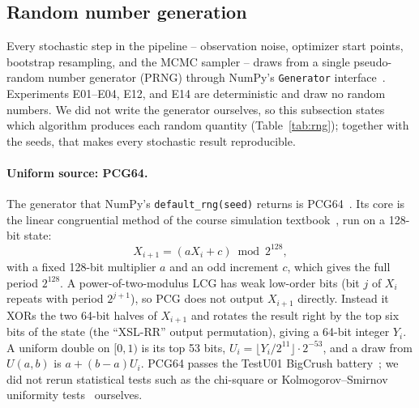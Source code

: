\subsection{Random number generation}
\label{sec:rng}
Every stochastic step in the pipeline -- observation noise, optimizer start points, bootstrap
resampling, and the MCMC sampler -- draws from a single pseudo-random number generator (PRNG)
through NumPy's \texttt{Generator} interface~\cite{harris2020numpy}. Experiments E01--E04, E12,
and E14 are deterministic and draw no random numbers. We did not write the generator ourselves, so
this subsection states which algorithm produces each random quantity
(Table~\ref{tab:rng}); together with the seeds, that makes every stochastic result reproducible.

\paragraph{Uniform source: PCG64.} The generator that NumPy's \texttt{default\_rng(seed)}
returns is PCG64~\cite{oneill2014pcg}. Its core is the linear congruential method of the course
simulation textbook~\cite{banks2010}, run on a 128-bit state:
\begin{equation}
  X_{i+1} = (a X_i + c) \bmod 2^{128}, \label{eq:lcg}
\end{equation}
with a fixed 128-bit multiplier $a$ and an odd increment $c$, which gives the full period
$2^{128}$. A power-of-two-modulus LCG has weak low-order bits (bit $j$ of $X_i$ repeats with period
$2^{j+1}$), so PCG does not output $X_{i+1}$ directly. Instead it XORs the two 64-bit halves of
$X_{i+1}$ and rotates the result right by the top six bits of the state (the ``XSL-RR'' output
permutation), giving a 64-bit integer $Y_i$. A uniform double on $[0,1)$ is its top 53 bits,
$U_i = \lfloor Y_i / 2^{11} \rfloor \cdot 2^{-53}$, and a draw from $U(a,b)$ is $a + (b-a)U_i$.
PCG64 passes the TestU01 BigCrush battery~\cite{oneill2014pcg}; we did not rerun statistical
tests such as the chi-square or Kolmogorov--Smirnov uniformity tests~\cite{banks2010} ourselves.

